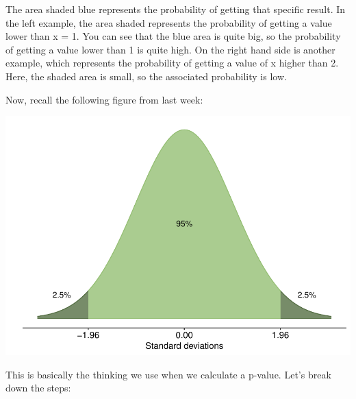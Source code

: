 \documentclass[
]{book}
\begin{document}


The area shaded blue represents the probability of getting that specific result. In the left example, the area shaded represents the probability of getting a value lower than x = 1. You can see that the blue area is quite big, so the probability of getting a value lower than 1 is quite high. On the right hand side is another example, which represents the probability of getting a value of x higher than 2. Here, the shaded area is small, so the associated probability is low.

Now, recall the following figure from last week:

\begin{center}\includegraphics{_main_files/figure-latex/unnamed-chunk-80-1} \end{center}

This is basically the thinking we use when we calculate a p-value. Let's break down the steps:
\end{document}
